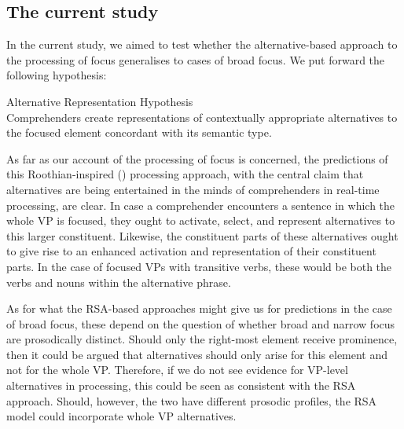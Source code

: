 \documentclass[output=paper,colorlinks,citecolor=brown]{langscibook}
\begin{document}
\subsection{The current study} 
In the current study, we aimed to test whether the alternative-based approach to the processing of focus generalises to cases of broad focus. We put forward the following hypothesis:

\ea Alternative Representation Hypothesis\\
Comprehenders create representations of contextually appropriate alternatives to the focused element concordant with its semantic type.
\z

As far as our account of the processing of focus is concerned, the predictions of this Roothian-inspired (\citeyear{rooth1992}) processing approach, with the central claim that alternatives are being entertained in the minds of comprehenders in real-time processing, are clear. In case a comprehender encounters a sentence in which the whole VP is focused, they ought to activate, select, and represent alternatives to this larger constituent. Likewise, the constituent parts of these alternatives ought to give rise to an enhanced activation and representation of their constituent parts. In the case of focused VPs with transitive verbs, these would be both the verbs and nouns within the alternative phrase.

As for what the RSA-based approaches might give us for predictions in the case of broad focus, these depend on the question of whether broad and narrow focus are prosodically distinct. Should only the right-most element receive prominence, then it could be argued that alternatives should only arise for this element and not for the whole VP. Therefore, if we do not see evidence for VP-level alternatives in processing, this could be seen as consistent with the RSA approach. Should, however, the two have different prosodic profiles, the RSA model could incorporate whole VP alternatives.
\end{document}
